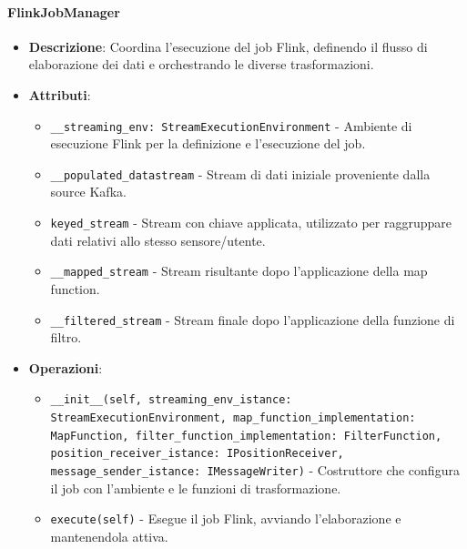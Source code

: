 \documentclass[10pt]{article}
\begin{document}
    \paragraph{FlinkJobManager}
    \begin{itemize}
        \item \textbf{Descrizione}: Coordina l'esecuzione del job Flink, definendo il flusso di elaborazione dei dati e orchestrando le diverse trasformazioni.
        \item \textbf{Attributi}:
        \begin{itemize}
            \item \texttt{\_\_streaming\_env: StreamExecutionEnvironment} - Ambiente di esecuzione Flink per la definizione e l'esecuzione del job.
            \item \texttt{\_\_populated\_datastream} - Stream di dati iniziale proveniente dalla source Kafka.
            \item \texttt{keyed\_stream} - Stream con chiave applicata, utilizzato per raggruppare dati relativi allo stesso sensore/utente.
            \item \texttt{\_\_mapped\_stream} - Stream risultante dopo l'applicazione della map function.
            \item \texttt{\_\_filtered\_stream} - Stream finale dopo l'applicazione della funzione di filtro.
        \end{itemize}
        \item \textbf{Operazioni}:
        \begin{itemize}
            \item \texttt{\_\_init\_\_(self, streaming\_env\_istance: StreamExecutionEnvironment, map\_function\_implementation: MapFunction, filter\_function\_implementation: FilterFunction, position\_receiver\_istance: IPositionReceiver, message\_sender\_istance: IMessageWriter)} - Costruttore che configura il job con l'ambiente e le funzioni di trasformazione.
            \item \texttt{execute(self)} - Esegue il job Flink, avviando l'elaborazione e mantenendola attiva.
        \end{itemize}
    \end{itemize}
\end{document}
